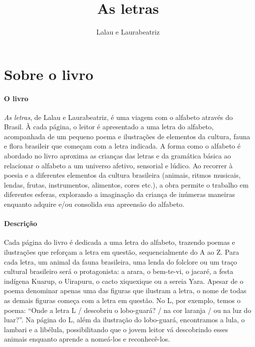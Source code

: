 \documentclass[11pt]{extarticle}
\newcommand{\AutorLivro}{Lalau e Laurabeatriz}
\newcommand{\TituloLivro}{As letras}
\newcommand{\colaborador}{{Paulo Pompermaier e Renier Silva}}
\begin{document}
\title{\TituloLivro}
\author{\AutorLivro}
\def\authornotes{\colaborador}

\date{}
\maketitle


\tableofcontents



\section{Sobre o livro}

\paragraph{O livro} \textit{As letras}, de Lalau e Laurabeatriz, é uma viagem com o alfabeto através do Brasil. À cada página, o leitor é apresentado a uma letra do alfabeto, acompanhada de um pequeno poema e ilustrações de elementos da cultura, fauna e flora brasileir que começam com a letra indicada.
A forma como o alfabeto é abordado no livro aproxima as crianças das letras e da gramática básica ao relacionar o alfabeto a um universo afetivo, sensorial e lúdico.
Ao recorrer à poesia e a diferentes elementos da cultura brasileira (animais, ritmos musicais, lendas, frutas, instrumentos, alimentos, cores etc.), a obra permite o trabalho em diferentes esferas, explorando a imaginação da criança de inúmeras maneiras enquanto adquire e/ou consolida sua apreensão do alfabeto.


\paragraph{Descrição} Cada página do livro é dedicada a uma letra do alfabeto, trazendo poemas e ilustrações que reforçam a letra em questão, sequencialmente do A ao Z.
Para cada letra, um animal da fauna brasileira, uma lenda do folclore ou um traço cultural brasileiro será o protagonista: a arara, o bem-te-vi, o jacaré, a festa indígena Kuarup, o Uirapuru, o cacto xiquexique ou a sereia Yara. Apesar de o poema denominar apenas uma das figuras que ilustram a letra, o nome de todas as demais figuras começa com a letra em questão. No L, por exemplo, temos o poema: ``Onde a letra L / descobriu o lobo-guará? / na cor laranja / ou na luz do luar?''. Na página do L, além da ilustração do lobo-guará, encontramos a lula, o lambari e a libélula, possibilitando que o jovem leitor vá descobrindo esses animais enquanto aprende a nomeá-los e reconhecê-los.
\end{document}
